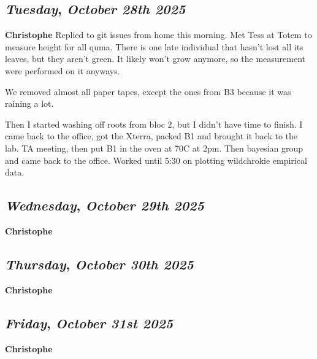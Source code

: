 \def\day{\textit{October 28th 2025}}
\def\weekday{\textit{Tuesday}}
\subsection*{\weekday, \day}
\textbf {Christophe}
Replied to git issues from home this morning. Met Tess at Totem to measure height for all quma. There is one late individual that hasn't lost all its leaves, but they aren't green. It likely won't grow anymore, so the measurement were performed on it anyways. 

We removed almost all paper tapes, except the ones from B3 because it was raining a lot. 

Then I started washing off roots from bloc 2, but I didn't have time to finish. I came back to the office, got the Xterra, packed B1 and brought it back to the lab. TA meeting, then put B1 in the oven at 70C at 2pm. Then bayesian group and came back to the office. Worked until 5:30 on plotting wildchrokie empirical data.

\def\day{\textit{October 29th 2025}}
\def\weekday{\textit{Wednesday}}
\subsection*{\weekday, \day}
\textbf {Christophe}

\def\day{\textit{October 30th 2025}}
\def\weekday{\textit{Thursday}}
\subsection*{\weekday, \day}
\textbf {Christophe}

\def\day{\textit{October 31st 2025}}
\def\weekday{\textit{Friday}}
\subsection*{\weekday, \day}
\textbf {Christophe}
